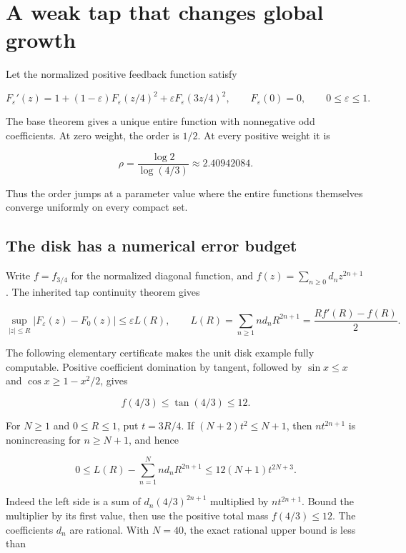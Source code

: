 \hypertarget{v11-resolution_full-a-weak-tap-that-changes-global-growth}{%
\section{A weak tap that changes global
growth}\label{v11-resolution_full-a-weak-tap-that-changes-global-growth}}

Let the normalized positive feedback function satisfy

\[
F_\varepsilon'(z)=1+(1-\varepsilon)F_\varepsilon(z/4)^2
 +\varepsilon F_\varepsilon(3z/4)^2,
\qquad F_\varepsilon(0)=0,
\qquad 0\le\varepsilon\le1.
\]

The base theorem gives a unique entire function with nonnegative odd
coefficients. At zero weight, the order is \(1/2\). At every positive
weight it is

\[
\rho=\frac{\log2}{\log(4/3)}\approx2.40942084.
\]

Thus the order jumps at a parameter value where the entire functions
themselves converge uniformly on every compact set.

\hypertarget{v11-resolution_full-the-disk-has-a-numerical-error-budget}{%
\subsection{The disk has a numerical error
budget}\label{v11-resolution_full-the-disk-has-a-numerical-error-budget}}

Write \(f=f_{3/4}\) for the normalized diagonal function, and
\(f(z)=\sum_{n\ge0}d_nz^{2n+1}\). The inherited tap continuity theorem
gives

\[
\sup_{|z|\le R}|F_\varepsilon(z)-F_0(z)|
\le \varepsilon L(R),\qquad
L(R)=\sum_{n\ge1}n d_nR^{2n+1}
=\frac{Rf'(R)-f(R)}2.
\tag{RA-1}
\]

The following elementary certificate makes the unit disk example fully
computable. Positive coefficient domination by tangent, followed by
\(\sin x\le x\) and \(\cos x\ge1-x^2/2\), gives

\[
f(4/3)\le\tan(4/3)\le12.
\]

For \(N\ge1\) and \(0\le R\le1\), put \(t=3R/4\). If
\((N+2)t^2\le N+1\), then \(n t^{2n+1}\) is nonincreasing for
\(n\ge N+1\), and hence

\[
0\le L(R)-\sum_{n=1}^{N}n d_nR^{2n+1}
\le12(N+1)t^{2N+3}.
\tag{RA-2}
\]

Indeed the left side is a sum of \(d_n(4/3)^{2n+1}\) multiplied by
\(n t^{2n+1}\). Bound the multiplier by its first value, then use the
positive total mass \(f(4/3)\le12\). The coefficients \(d_n\) are
rational. With \(N=40\), the exact rational upper bound is less than

